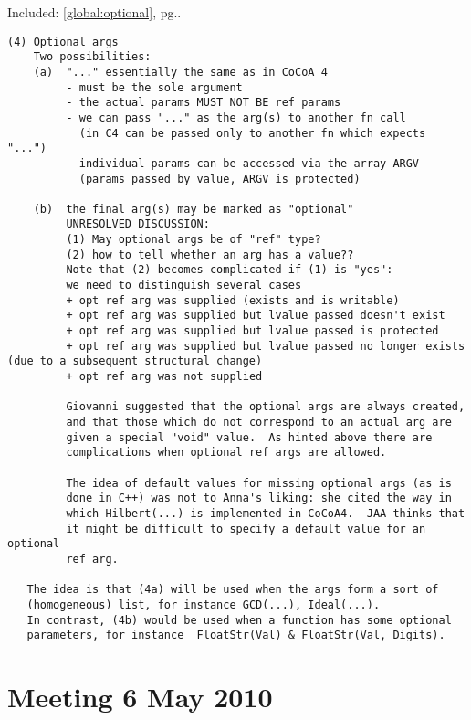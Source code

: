 \documentclass{book}[12,a4paper]
\def\refandpage#1{{\ref{#1}, pg.\pageref{#1}}}
\begin{document}
Included: \refandpage{global:optional}.
\begin{verbatim}
(4) Optional args
    Two possibilities:
    (a)  "..." essentially the same as in CoCoA 4
         - must be the sole argument
         - the actual params MUST NOT BE ref params
         - we can pass "..." as the arg(s) to another fn call
           (in C4 can be passed only to another fn which expects "...")
         - individual params can be accessed via the array ARGV
           (params passed by value, ARGV is protected)

    (b)  the final arg(s) may be marked as "optional"
         UNRESOLVED DISCUSSION:
         (1) May optional args be of "ref" type?
         (2) how to tell whether an arg has a value??
         Note that (2) becomes complicated if (1) is "yes":
         we need to distinguish several cases
         + opt ref arg was supplied (exists and is writable)
         + opt ref arg was supplied but lvalue passed doesn't exist
         + opt ref arg was supplied but lvalue passed is protected
         + opt ref arg was supplied but lvalue passed no longer exists (due to a subsequent structural change)
         + opt ref arg was not supplied

         Giovanni suggested that the optional args are always created,
         and that those which do not correspond to an actual arg are
         given a special "void" value.  As hinted above there are
         complications when optional ref args are allowed.

         The idea of default values for missing optional args (as is
         done in C++) was not to Anna's liking: she cited the way in
         which Hilbert(...) is implemented in CoCoA4.  JAA thinks that
         it might be difficult to specify a default value for an optional
         ref arg.

   The idea is that (4a) will be used when the args form a sort of
   (homogeneous) list, for instance GCD(...), Ideal(...).
   In contrast, (4b) would be used when a function has some optional
   parameters, for instance  FloatStr(Val) & FloatStr(Val, Digits).
\end{verbatim}

\section{Meeting 6 May 2010}
\end{document}
